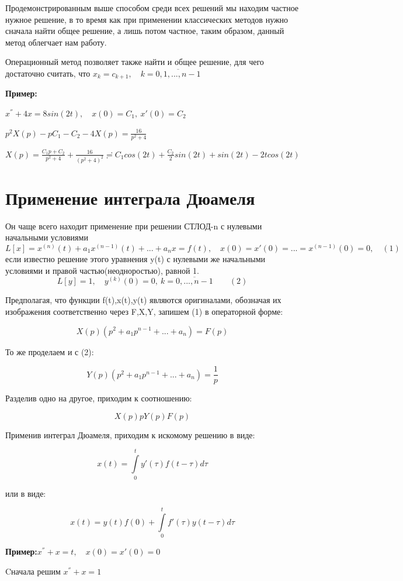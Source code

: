 \documentclass[a4paper, 12pt]{report}
\begin{document}
Продемонстрированным выше способом среди всех решений мы находим частное нужное решение, в то время как при применении классических методов нужно сначала найти общее решение, а лишь потом частное, таким образом, данный метод облегчает нам работу.
\par\bigskip
Операционный метод позволяет также найти и общее решение, для чего достаточно считать, что $x_k=c_{k+1},\quad k=\overline{0,1,...,n-1}$

\par\bigskip
\textbf{Пример:}

$x^{''}+4x=8sin(2t),\quad x(0)=C_1,\ x'(0)=C_2$

$p^2X(p)-pC_1-C_2-4X(p)=\frac{16}{p^2+4}$

$X(p)=\frac{C_1p+C_2}{p^2+4}+\frac{16}{(p^2+4)^2} \risingdotseq C_1cos(2t)+\frac{C_2}{2}sin(2t)+sin(2t)-2tcos(2t)$

\section{Применение интеграла Дюамеля}

Он чаще всего находит применение при решении СТЛОД-n  с нулевыми начальными условиями
$$L[x]=x^{(n)}(t)+a_1x^{(n-1)}(t)+...+a_n x=f(t),\quad x(0)=x'(0)=...=x^{(n-1)}(0)=0,\quad (1)$$ если известно решение этого уравнения y(t) с нулевыми же начальными условиями и правой частью(неодноростью), равной 1.
$$L[y]=1,\quad y^{(k)}(0)=0, \ k=\overline{0,...,n-1}\quad\quad(2)$$

Предполагая, что функции f(t),x(t),y(t) являются оригиналами, обозначая их изображения соответственно через F,X,Y, запишем (1) в операторной форме:

$$X(p)(p^2+a_1p^{n-1}+...+a_n)=F(p)$$

То же проделаем и с (2):

$$Y(p)(p^2+a_1p^{n-1}+...+a_n)=\frac1{p}$$

Разделив одно на другое, приходим к соотношению:

$$X(p)pY(p)F(p)$$

Применив интеграл Дюамеля, приходим к искомому решению в виде:

$$x(t)=\int\limits_0^t y'(\tau)f(t-\tau)d\tau$$

или в виде:

$$x(t)=y(t)f(0)+\int\limits_0^t f'(\tau)y(t-\tau)d\tau$$

\textbf{Пример:}\quad $x^{''}+x=t, \quad x(0)=x'(0)=0$

Cначала решим $x^{''}+x=1$
\end{document}
